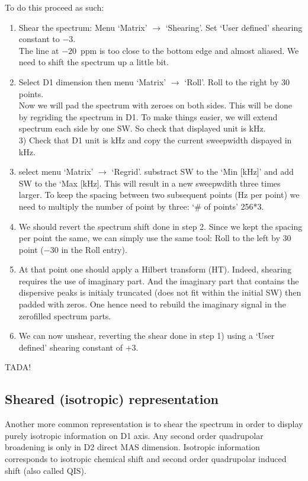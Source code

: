 \documentclass[11pt,a4paper]{article}
\begin{document}
To do this proceed as such:
\begin{enumerate}
\item Shear the spectrum: Menu `Matrix' $\longrightarrow$ `Shearing'. Set `User defined' shearing constant to $-3$. \\
The line at $-20$~ppm is too close to the bottom edge and almost aliased. We need to shift the spectrum up a little bit.
\item Select D1 dimension then menu `Matrix' $\longrightarrow$ `Roll'. Roll to the right by 30 points.\\
Now we will pad the spectrum with zeroes on both sides. This will be done by regriding the spectrum in D1. 
To make things easier, we will extend spectrum each side by one SW. So check that displayed unit is kHz.\\
3) Check that D1 unit is kHz and copy the current sweepwidth dispayed in kHz.\\
\item select menu `Matrix' $\longrightarrow$ `Regrid'. substract SW to the `Min [kHz]' and add SW to the `Max [kHz]. 
This will result in a new sweepwdith three times larger. To keep the spacing between two subsequent points (Hz per point)
 we need to multiply the number of point by three:  `\# of points' 256*3.\\
\item We should revert the spectrum shift done in step 2. Since we kept the spacing per point the same, we can simply
use the same tool: Roll to the left by 30 point ($-30$ in the Roll entry).\\
\item At that point one should apply a Hilbert transform (HT). Indeed, shearing requires the use of imaginary part. And the 
imaginary part that contains the dispersive peaks is initialy truncated (does not fit within the initial SW) then 
padded with zeros. One hence need to rebuild the imaginary signal in the zerofilled spectrum parts.\\
\item We can now unshear, reverting the shear done in step 1) using a  `User defined' shearing constant of $+3$.\\
\end{enumerate}

TADA!

\subsection{Sheared (isotropic) representation}
Another more common representation is to shear the spectrum in order to display purely isotropic information on D1 axis. Any 
second order quadrupolar broadening is only in D2 direct MAS dimension. Isotropic information corresponds to isotropic chemical
shift and second order quadrupolar induced shift (also called QIS).
\end{document}
